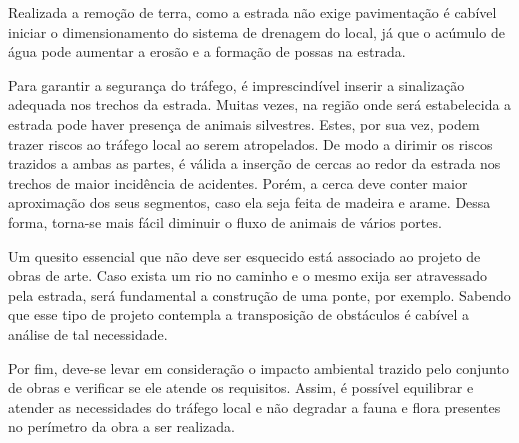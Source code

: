 Realizada a remoção de terra, como a estrada não exige pavimentação é cabível iniciar o dimensionamento do sistema de drenagem do local, já que o acúmulo de água pode aumentar a erosão e a formação de possas na estrada.

Para garantir a segurança do tráfego, é imprescindível inserir a sinalização adequada nos trechos da estrada. Muitas vezes, na região onde será estabelecida a estrada pode haver presença de animais silvestres. Estes, por sua vez, podem trazer riscos ao tráfego local ao serem atropelados. De modo a dirimir os riscos trazidos a ambas as partes, é válida a inserção de cercas ao redor da estrada nos trechos de maior incidência de acidentes. Porém, a cerca deve conter maior aproximação dos seus segmentos, caso ela seja feita de madeira e arame. Dessa forma, torna-se mais fácil diminuir o fluxo de animais de vários portes. 
 
Um quesito essencial que não deve ser esquecido está associado ao projeto de obras de arte. Caso exista um rio no caminho e o mesmo exija ser atravessado pela estrada, será fundamental a construção de uma ponte, por exemplo. Sabendo que esse tipo de projeto contempla a transposição de obstáculos é cabível a análise de tal necessidade.

Por fim, deve-se levar em consideração o impacto ambiental trazido pelo conjunto de obras e verificar se ele atende os requisitos. Assim, é possível equilibrar e atender as necessidades do tráfego local e não degradar a fauna e flora presentes no perímetro da obra a ser realizada.